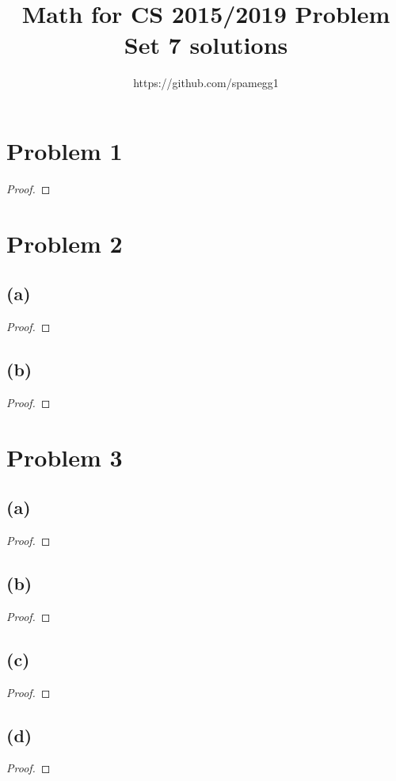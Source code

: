 \documentclass[14pt]{extarticle}
\title{Math for CS 2015/2019 Problem Set 7 solutions}
\author{https://github.com/spamegg1}
\begin{document}
\maketitle
\tableofcontents

\section{Problem 1}

\begin{proof}

\end{proof}

\section{Problem 2}
\subsection{(a)}

\begin{proof}
\end{proof}

\subsection{(b)}
\begin{proof}
\end{proof}

\section{Problem 3}

\subsection{(a)}
\begin{proof}
\end{proof}

\subsection{(b)}
\begin{proof}
\end{proof}

\subsection{(c)}
\begin{proof}
\end{proof}

\subsection{(d)}
\begin{proof}
\end{proof}
\end{document}
